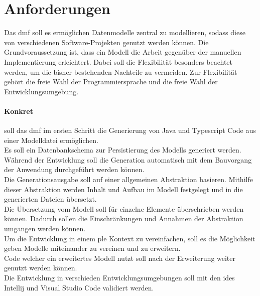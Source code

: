 \documentclass[./einleitung.tex]{subfiles}
\begin{document}
\section{Anforderungen}\label{sec:aufgabenstellung}
Das \acrfull{dmf} soll es ermöglichen Datenmodelle zentral zu modellieren, sodass diese von verschiedenen Software-Projekten genutzt werden können.
Die Grundvoraussetzung ist, dass ein Modell die Arbeit gegenüber der manuellen Implementierung erleichtert.
Dabei soll die Flexibilität besonders beachtet werden, um die bisher bestehenden Nachteile zu vermeiden.
Zur Flexibilität gehört die freie Wahl der Programmiersprache und die freie Wahl der Entwicklungsumgebung.

\paragraph{Konkret} soll das \acrshort{dmf} im ersten Schritt die Generierung von Java und Typescript Code aus einer Modelldatei ermöglichen.\\
Es soll ein Datenbankschema zur Persistierung des Modells generiert werden.\\
Während der Entwicklung soll die Generation automatisch mit dem Bauvorgang der Anwendung durchgeführt werden können.\\
Die Generationsausgabe soll auf einer allgemeinen Abstraktion basieren.
Mithilfe dieser Abstraktion werden Inhalt und Aufbau im Modell festgelegt und in die generierten Dateien übersetzt.\\
Die Übersetzung vom Modell soll für einzelne Elemente überschrieben werden können.
Dadurch sollen die Einschränkungen und Annahmen der Abstraktion umgangen werden können.\\
Um die Entwicklung in einem \acrshort{ple} Kontext zu vereinfachen, soll es die Möglichkeit geben Modelle miteinander zu vereinen und zu erweitern.\\
Code welcher ein erweitertes Modell nutzt soll nach der Erweiterung weiter genutzt werden können.\\
Die Entwicklung in verschieden Entwicklungsumgebungen soll mit den \acrshort{ide}s Intellij und Visual Studio Code validiert werden.\\
\end{document}
